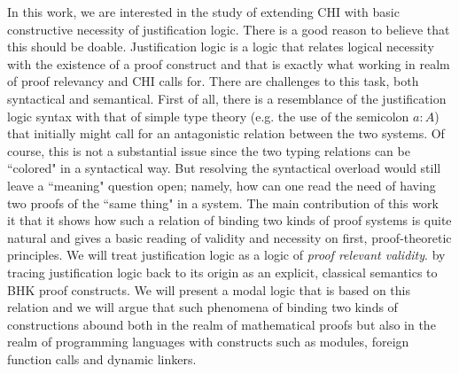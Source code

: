 In this work, we are interested in the study of  extending  \acrfull{CHI} with basic 
constructive  necessity of justification logic. 
There is a good reason to believe that this should be doable. Justification logic
 is a logic that relates logical necessity with the existence of a proof construct
  and that is exactly what working in  realm of proof relevancy and \ac{CHI} calls for. 
  There are challenges to this task, both syntactical and  semantical. First of all, there
   is a resemblance of the justification logic syntax with that of simple type theory 
   (e.g. the use of the semicolon $a:A$) that  initially might call for an antagonistic relation
    between the two systems. Of course, this is not a substantial issue since the two
     typing relations can be ``colored" in a syntactical way. 
     But resolving the syntactical overload would still leave a  ``meaning" question open;
      namely, how can one read  the need of having two
       proofs of the ``same thing" in a system. 
       The main contribution of this work  
       ~\cite{Pouliasis2016} it that it  shows how such a relation of binding two kinds of
        proof systems is quite natural and gives a basic reading of validity and necessity 
        on first, proof-theoretic principles.  
        We will treat justification logic as a logic of \textit{proof relevant validity}.
         by tracing justification logic back to its 
         origin as an explicit, classical semantics to \ac{BHK} proof constructs. 
         We will present a modal logic that is based on this relation and we will argue
          that such phenomena of binding two kinds of constructions abound both
           in the realm  of mathematical proofs 
           but also in the realm of programming languages  with constructs 
           such as modules, foreign function calls and dynamic linkers.


